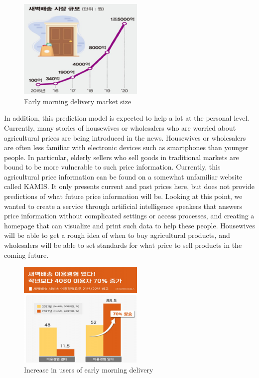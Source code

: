 \documentclass[conference]{IEEEtran}
\begin{document}
\begin{figure}[!htbp]
\centering
    \includegraphics[width =6cm]{pictures/picture1.eps}
    \hfil
\caption{Early morning delivery market size}
\label{Early morning delivery market siz}
\end{figure}

In addition, this prediction model is expected to help a lot at the personal level. Currently, many stories of housewives or wholesalers who are worried about agricultural prices are being introduced in the news. Housewives or wholesalers are often less familiar with electronic devices such as smartphones than younger people. In particular, elderly sellers who sell goods in traditional markets are bound to be more vulnerable to such price information. Currently, this agricultural price information can be found on a somewhat unfamiliar website called KAMIS. It only presents current and past prices here, but does not provide predictions of what future price information will be. Looking at this point, we wanted to create a service through artificial intelligence speakers that answers price information without complicated settings or access processes, and creating a homepage that can visualize and print such data to help these people. Housewives will be able to get a rough idea of when to buy agricultural products, and wholesalers will be able to set standards for what price to sell products in the coming future.

\begin{figure}[!htbp]
\centering
    \includegraphics[width =6cm]{pictures/picture2.eps}
    \hfil
\caption{Increase in users of early morning delivery}
\label{Increase in users of early morning delivery}
\end{figure}
\end{document}
